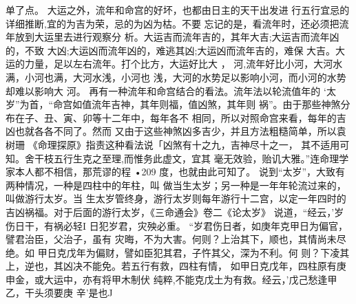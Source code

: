 单了点。
大运之外，流年和命宫的好坏，也都由日主的天干出发进
行五行宜忌的详细推断,宜的为吉为荣，忌的为凶为枯。不要
忘记的是，看流年时，还必须把流年放到大运里去进行观察分
析。大运吉而流年吉的，其年大吉;大运吉而流年凶的，不致
大凶;大运凶而流年凶的，难逃其凶;大运凶而流年吉的，难保
大吉。大运的力量，足以左右流年。打个比方，大运好比大 ，
河,流年好比小河，大河水满，小河也满，大河水浅，小河也
浅，大河的水势足以影响小河，而小河的水势却难以影响大
河。
再有一种流年和命宫结合的看法。流年法以轮流值年的
‘太岁”为首，“命宫如值流年吉神，其年则福，值凶煞，其年则
祸”。由于那些神煞分布在子、丑、寅、卯等十二年中，每年各不
相同，所以对照命宫来看，每年的吉凶也就各各不同了。然而
又由于这些神煞凶多吉少，并且方法粗糙简单，所以袁树珊
《命理探原》指责这种看法说「凶煞有十之九，吉神尽十之一，
其不适用可知。舍干枝五行生克之至理,而惟务此虚文，宜其
毫无效验，贻讥大雅。”连命理学家本人都不相信，那荒谬的程
•209
度，也就由此可知了。
说到“太岁”，大致有两种情况，一种是四柱中的年柱，叫
做当生太岁；另一种是一年年轮流过来的，叫做游行太岁。当
生太岁管终身，游行太岁则每年游行十二宫，以定一年四时的
吉凶祸福。对于后面的游行太岁，《三命通会》卷二《论太岁》
说道，“经云，'岁伤日干，有祸必轻I 日犯岁君，灾殃必重。
“岁君伤日者，如庚年克甲日为偏官，譬君治臣，父治子，虽有
灾晦，不为大害。何则？上治其下，顺也，其情尚未尽绝。如
甲日克戊年为偏财，譬如臣犯其君，子忤其父，深为不利。何
则？下凌其上，逆也，其凶决不能免。若五行有救，四柱有情，
如甲日克戊年，四柱原有庚申金，或大运中，亦有将甲木制伏
纯粹,不能克戊土为有救。经云，'戊己愁逢甲乙，干头须要庚
辛'是也J

